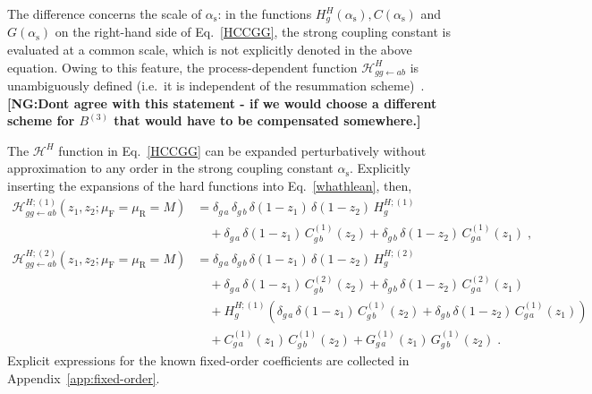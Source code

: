 \documentclass[12pt]{article}
\DeclareRobustCommand{\nn}{\nonumber}
\DeclareRobustCommand{\NG}[1]{\textbf{\quad\color{blue}[NG:\quad #1]}\xspace}
\DeclareRobustCommand{\alphas}{\ensuremath{\alpha_{\mathrm{s}}}\xspace}
\DeclareRobustCommand{\as}{\alphas}
\DeclareRobustCommand{\mur}{\ensuremath{\mu_{\mathrm{R}}}\xspace}
\DeclareRobustCommand{\muf}{\ensuremath{\mu_{\mathrm{F}}}\xspace}
\DeclareRobustCommand{\cH}{\ensuremath{\mathcal{H}}}
\begin{document}
{\color{black!30}
The difference concerns the scale of $\as$: in the functions $H^H_g(\as), C(\as)$ and $G(\as)$ on the right-hand side of Eq.~\eqref{HCCGG}, the strong coupling constant is evaluated at a common scale, which is not explicitly denoted in the above equation. Owing to this feature, the process-dependent function $\cH^H_{gg\gets ab}$ is unambiguously defined
(i.e.\ it is independent of the resummation scheme)~\cite{Catani:2000vq}. }
\NG{Dont agree with this statement - if we would choose a different scheme for $B^{(3)}$ that would have to be compensated somewhere.}

The $\cH^H$ function in Eq.~\eqref{HCCGG} can be expanded perturbatively without approximation to any order in the strong coupling constant $\as$. Explicitly inserting the expansions of the hard functions into Eq.~\eqref{whathlean}, 
then,
\begin{align}
  \cH^{H;(1)}_{gg\gets ab}(z_1,z_2; \muf=\mur=M)
  &=
  \delta_{g\,a} \,\delta_{g\,b} 
  \,\delta(1-z_1) \,\delta(1-z_2) 
  \,H^{H;(1)}_g 
  \nn\\&\quad
  +\delta_{g\,a} \,\delta(1-z_1) \,C^{(1)}_{g\,b}(z_2)
  +\delta_{g\,b} \,\delta(1-z_2) \,C^{(1)}_{g\,a}(z_1) \; , 
  \label{H1}
  \\
  \cH^{H;(2)}_{gg\gets ab}(z_1,z_2; \muf=\mur=M)
  &=
  \delta_{g\,a} \,\delta_{g\,b}
  \,\delta(1-z_1) \,\delta(1-z_2) 
  \,H^{H;(2)}_g
  \nn\\&\quad
  +\delta_{g\,a} \,\delta(1-z_1) \,C^{(2)}_{g\,b}(z_2)
  +\delta_{g\,b} \,\delta(1-z_2) \,C^{(2)}_{g\,a}(z_1)
  \nn\\&\quad
  +H^{H;(1)}_g\left(
  \delta_{g\,a} \,\delta(1-z_1) \,C^{(1)}_{g\,b}(z_2) +
  \delta_{g\,b} \,\delta(1-z_2) \,C^{(1)}_{g\,a}(z_1)
  \right)
  \nn\\&\quad
  +C^{(1)}_{g\,a}(z_1) \, C^{(1)}_{g\,b}(z_2)
  +G^{(1)}_{g\,a}(z_1) \, G^{(1)}_{g\,b}(z_2) \; .
  \label{H2}
\end{align}
Explicit expressions for the known fixed-order coefficients are collected in Appendix~\ref{app:fixed-order}. 
\end{document}
